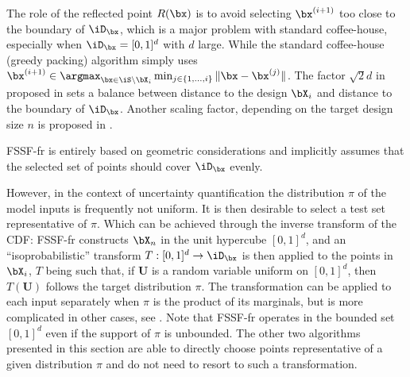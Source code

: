 The role of the reflected point $R(\bx)$ is to avoid selecting $\bx^{(i+1)}$ too close to the boundary of $\iD_\bx$, which is a major problem with standard coffee-house, especially when $\iD_\bx=[0,1]^d$ with $d$ large. 
While the standard coffee-house (greedy packing) algorithm simply uses $\bx^{(i+1)} \in \argmax_{\bx \in \iS \setminus \bX_i} \min_{j \in \{1,\ldots,i\}} \|\bx-\bx^{(j)}\|$. 
The factor $\sqrt{2}d$ in  proposed in \citet{shang_apley_2020} sets a balance between distance to the design $\bX_i$ and distance to the boundary of $\iD_\bx$. 
Another scaling factor, depending on the target design size $n$ is proposed in \citet{NogalesPR2021}.
 
FSSF-fr is entirely based on geometric considerations and implicitly assumes that the selected set of points should cover $\iD_\bx$ evenly. 

However, in the context of uncertainty quantification the distribution $\pi$ of the model inputs is frequently not uniform. 
It is then desirable to select a test set representative of $\pi$. 
Which can be achieved through the inverse transform of the CDF: FSSF-fr constructs $\bX_n$ in the unit hypercube $[0,1]^d$, and an ``isoprobabilistic'' transform $T:[0,1]^d \rightarrow \iD_\bx$ is then applied to the points in $\bX_i$, $T$ being such that, if $\boldsymbol{U}$ is a random variable uniform on $[0,1]^d$, then $T(\boldsymbol{U})$ follows the target distribution $\pi$. 
The transformation can be applied to each input separately when $\pi$ is the product of its marginals, but is more complicated in other cases, see \citep[Chap.~4]{lemaire_2009}. 
Note that FSSF-fr operates in the bounded set $[0,1]^d$ even if the support of $\pi$ is unbounded. 
The other two algorithms presented in this section are able to directly choose points representative of a given distribution $\pi$ and do not need to resort to such a transformation.

